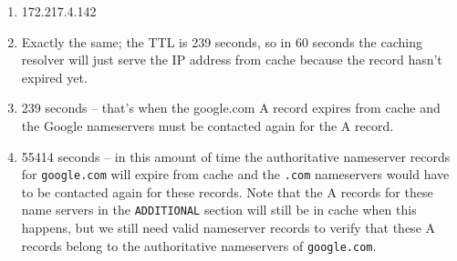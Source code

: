 \documentclass{report}
\begin{document}
\begin{problem}
\begin{enumerate}
\end{enumerate}


\begin{answer}{50em}
  \begin{enumerate}
  \item 172.217.4.142
  \item Exactly the same; the TTL is 239 seconds, so in 60 seconds the caching
        resolver will just serve the IP address from cache because the record
        hasn't expired yet.
  \item 239 seconds -- that's when the google.com A record expires from cache
        and the Google nameservers must be contacted again for the A record.
  \item 55414 seconds -- in this amount of time the authoritative nameserver
        records for \texttt{google.com} will expire from cache and the
        \texttt{.com} nameservers would have to be contacted again for these
        records. Note that the A records for these name servers in the
        \texttt{ADDITIONAL} section will still be in cache when this happens,
        but we still need valid nameserver records to verify that these
        A records belong to the authoritative nameservers of \texttt{google.com}.

  \end{enumerate}
\end{answer}

\end{problem}
\end{document}
